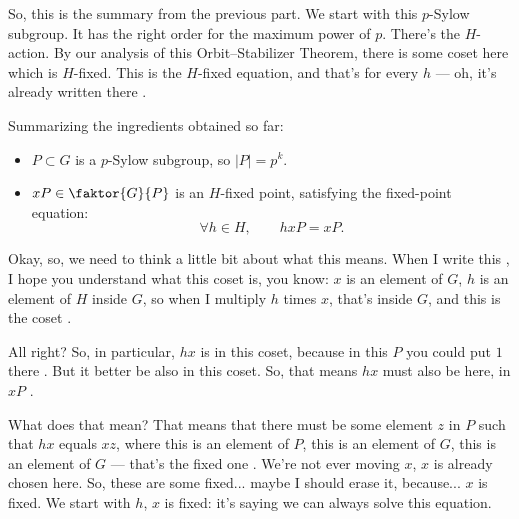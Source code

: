 \begin{proofWrapper}
\begin{speech}[00:29:24 - 00:30:35]
So, this is the summary from the previous part. We start with this $p$-Sylow subgroup. It has the right order for the maximum power of $p$. There's the $H$-action. By our analysis of this Orbit--Stabilizer Theorem, there is some coset here which is $H$-fixed. This is the $H$-fixed equation, and that's for every $h$ --- oh, it's already written there .
\end{speech}

\begin{content}
Summarizing the ingredients obtained so far:
\begin{itemize}
    \item $P \subset G$ is a $p$-Sylow subgroup, so $|P| = p^k$.
    \item $x P \in \faktor{G}{P}$ is an $H$-fixed point, satisfying the fixed-point equation:
    \[
    \forall h \in H, \qquad h x P = x P.
    \]
\end{itemize}
\end{content}

\begin{speech}[00:30:35 - 00:32:09]
Okay, so, we need to think a little bit about what this means. When I write this , I hope you understand what this coset is, you know: $x$ is an element of $G$, $h$ is an element of $H$ inside $G$, so when I multiply $h$ times $x$, that's inside $G$, and this is the coset .

All right? So, in particular, $h x$ is in this coset, because in this $P$ you could put $1$ there . But it better be also in this coset. So, that means $h x$ must also be here, in $x P$ .

What does that mean? That means that there must be some element $z$ in $P$ such that $h x$ equals $x z$, where this is an element of $P$, this is an element of $G$, this is an element of $G$ --- that's the fixed one . We're not ever moving $x$, $x$ is already chosen here. So, these are some fixed... maybe I should erase it, because... $x$ is fixed. We start with $h$, $x$ is fixed: it's saying we can always solve this equation.


\end{speech}
\end{proofWrapper}

